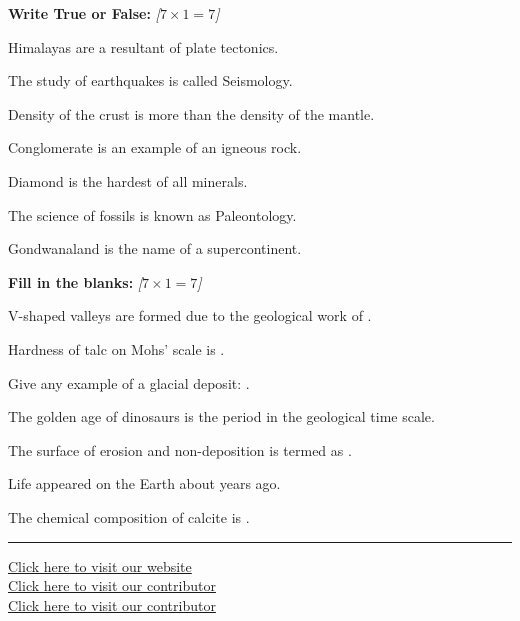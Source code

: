 \documentclass[11pt,a4paper]{article}
\newcommand{\pts}[1]{\hfill   \textit{[#1]}}
\begin{document}
\begin{romanparts}
  \item   \textbf{Write True or False:} \pts{$7  \times 1 = 7$}
  
\begin{parts}
    \item Himalayas are a resultant of plate tectonics.
    \item The study of earthquakes is called Seismology.
    \item Density of the crust is more than the density of the mantle.
    \item Conglomerate is an example of an igneous rock.
    \item Diamond is the hardest of all minerals.
    \item The science of fossils is known as Paleontology.
    \item Gondwanaland is the name of a supercontinent.
  \end{parts}
  
  \item   \textbf{Fill in the blanks:} \pts{$7  \times 1 = 7$}
  
\begin{parts}
    \item V-shaped valleys are formed due to the geological work of \underline{\hspace{4cm}}.
    \item Hardness of talc on Mohs' scale is \underline{\hspace{3cm}}.
    \item Give any example of a glacial deposit: \underline{\hspace{4cm}}.
    \item The golden age of dinosaurs is the \underline{\hspace{3cm}} period in the geological time scale.
    \item The surface of erosion and non-deposition is termed as \underline{\hspace{4cm}}.
    \item Life appeared on the Earth about \underline{\hspace{3cm}} years ago.
    \item The chemical composition of calcite is \underline{\hspace{4cm}}.
  \end{parts}
\end{romanparts}

\vfill\rule{\linewidth}{0.4pt}

\begin{center}\small
\href{https://bhu-exam.vercel.app/}{Click here to visit our website}\\[4pt]
\href{https://me-aryan.vercel.app/}{Click here to visit our contributor}\\[4pt]
\href{https://quashan-me.vercel.app/}{Click here to visit our contributor}
\end{center}
\end{document}
